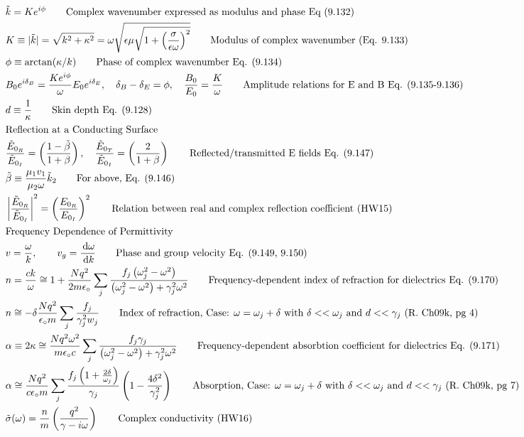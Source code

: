 \documentclass[10pt]{article}
\newcommand{\dd}{\, \mathrm{d}}
\newcommand{\eo}{\epsilon_\circ}
\newcommand{\tder}[2]{\frac{\dd #1}{\dd #2}}
\begin{document}
\begin{align*}
& \tilde{k} = Ke^{i\phi} \tag*{Complex wavenumber expressed as modulus and phase Eq (9.132)}\\
& K \equiv |\tilde{k}| = \sqrt{k^2+ \kappa^2} = \omega\sqrt{\epsilon \mu \sqrt{1+\left( \frac{\sigma}{\epsilon \omega} \right)^2}} \tag*{Modulus of complex wavenumber (Eq. 9.133)} \\
& \phi \equiv \arctan(\kappa/k) \tag*{Phase of complex wavenumber Eq. (9.134)} \\
& B_0 e^{i \delta_B} = \frac{Ke^{i\phi}}{\omega}E_0e^{i \delta_E}, \quad \delta_B - \delta_E = \phi, \quad  \frac{B_0}{E_0} = \frac{K}{\omega} \tag*{Amplitude relations for E and B Eq. (9.135-9.136)}\\
& d \equiv \frac{1}{\kappa} \tag*{Skin depth Eq. (9.128)}\\
\intertext{Reflection at a Conducting Surface}
&\frac{\tilde{E}_{0_R}}{\tilde{E}_{0_I}} = \left( \frac{1 - \tilde{\beta}}{1 + \beta} \right), \quad \frac{\tilde{E}_{0_T}}{\tilde{E}_{0_I}} = \left( \frac{2}{1 + \beta} \right) \tag*{Reflected/transmitted E fields Eq. (9.147)} \\
& \tilde{\beta} \equiv \frac{\mu_1 v_1}{\mu_2 \omega} \tilde{k}_2 \tag*{For above, Eq. (9.146)} \\
& \left| \frac{\tilde{E}_{0_R}}{\tilde{E}_{0_I}} \right|^2 = \left( \frac{E_{0_R}}{E_{0_I}} \right)^2 \tag*{Relation between real and complex reflection coefficient (HW15)} \\
\intertext{Frequency Dependence of Permittivity}
& v = \frac{\omega}{k}, \qquad v_g = \tder{\omega}{k} \tag*{Phase and group velocity Eq. (9.149, 9.150)} \\
& n= \frac{ck}{\omega} \cong 1 + \frac{Nq^2}{2m\eo} \sum_j \frac{f_j \left( \omega_j^2 - \omega^2 \right)}{\left( \omega_j^2 - \omega^2 \right) + \gamma_j^2 \omega^2} \tag*{Frequency-dependent index of refraction for dielectrics Eq. (9.170)} \\
& n \cong -\delta \frac{Nq^2}{\eo m} \sum_j \frac{f_j}{\gamma_j^2 w_j} \tag*{Index of refraction, Case: $\omega = \omega_j + \delta$ with $\delta << \omega_j$ and $d << \gamma_j$ (R. Ch09k, pg 4)}\\
& \alpha \equiv 2 \kappa \cong \frac{Nq^2\omega^2}{m\eo c} \sum_j \frac{f_j \gamma_j}{\left( \omega_j^2 - \omega^2 \right) + \gamma_j^2 \omega^2} \tag*{Frequency-dependent absorbtion coefficient for dielectrics Eq. (9.171)}\\
& \alpha \cong \frac{Nq^2}{c\eo m} \sum_j \frac{f_j \left( 1 + \frac{2 \delta}{\omega_j} \right)}{\gamma_j} \left( 1 - \frac{4 \delta^2}{\gamma_j^2} \right) \tag*{Absorption, Case: $\omega = \omega_j + \delta$ with $\delta << \omega_j$ and $d << \gamma_j$ (R. Ch09k, pg 7)}\\
& \tilde{\sigma}(\omega) = \frac{n}{m}\left( \frac{q^2}{\gamma - i \omega} \right) \tag*{Complex conductivity (HW16)}
\end{align*}



 
\end{document}

